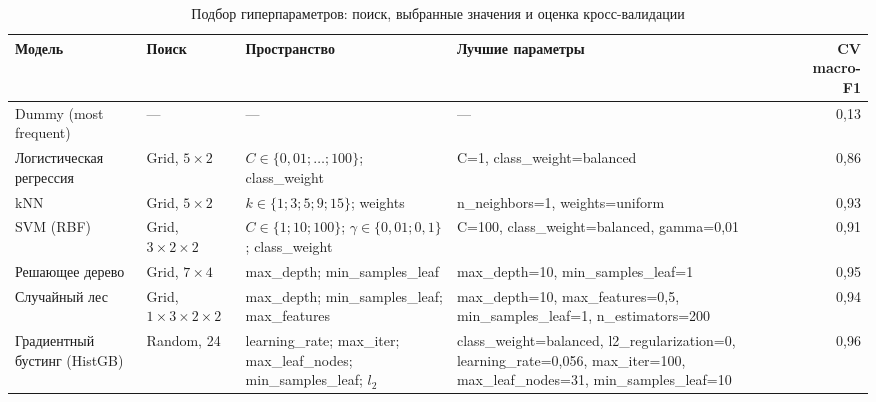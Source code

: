 \begin{table}[H]
\centering
\footnotesize
\setlength{\tabcolsep}{3pt}
\caption{Подбор гиперпараметров: поиск, выбранные значения и оценка кросс-валидации}\label{tab:search}
\begin{tabular}{@{}>{\raggedright\arraybackslash}p{2.4cm}>{\raggedright\arraybackslash}p{1.5cm}>{\raggedright\arraybackslash}p{4.1cm}>{\raggedright\arraybackslash}p{4.2cm}r@{}}
\toprule
Модель & Поиск & Пространство & Лучшие параметры & CV macro-F1 \\
\midrule
Dummy (most frequent) & --- & --- & --- & 0,13 \\
Логистическая регрессия & Grid, $5\times2$ & $C\in\{0{,}01;\ldots;100\}$; class\_weight & C=1, class\_weight=balanced & 0,86 \\
kNN & Grid, $5\times2$ & $k\in\{1;3;5;9;15\}$; weights & n\_neighbors=1, weights=uniform & 0,93 \\
SVM (RBF) & Grid, $3\times2\times2$ & $C\in\{1;10;100\}$; $\gamma\in\{0{,}01;0{,}1\}$; class\_weight & C=100, class\_weight=balanced, gamma=0,01 & 0,91 \\
Решающее дерево & Grid, $7\times4$ & max\_depth; min\_samples\_leaf & max\_depth=10, min\_samples\_leaf=1 & 0,95 \\
Случайный лес & Grid, $1\times3\times2\times2$ & max\_depth; min\_samples\_leaf; max\_features & max\_depth=10, max\_features=0,5, min\_samples\_leaf=1, n\_estimators=200 & 0,94 \\
Градиентный бустинг (HistGB) & Random, 24 & learning\_rate; max\_iter; max\_leaf\_nodes; min\_samples\_leaf; $l_2$ & class\_weight=balanced, l2\_regularization=0, learning\_rate=0,056, max\_iter=100, max\_leaf\_nodes=31, min\_samples\_leaf=10 & 0,96 \\
\bottomrule
\end{tabular}
\end{table}